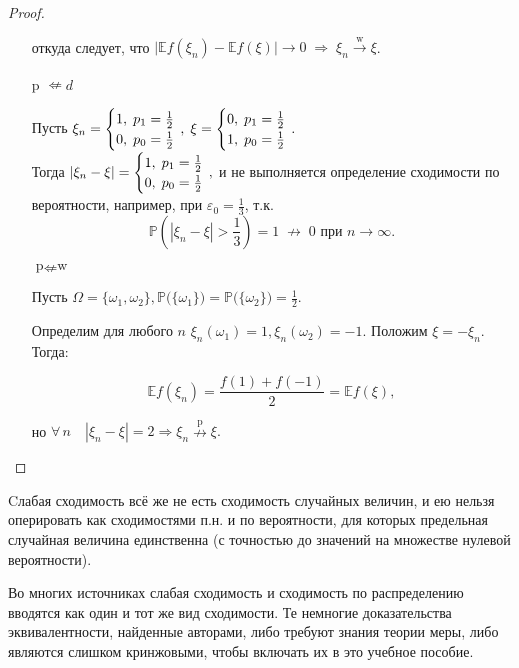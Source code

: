 \begin{proof}
\begin{itemize}
        откуда следует, что $\bigl|\mathbb{E}f(\xi_n) - \mathbb{E}f(\xi)\bigr| \rightarrow 0 \; \Rightarrow \; \xi_n \xrightarrow[]{\text{w}} \xi$.
        
    \item[p $\nLeftarrow d$]
    
        Пусть $\xi_n = \begin{cases}
        1, \; p_1 = \frac{1}{2} \\
        0, \; p_0 = \frac{1}{2}
        \end{cases} \negthickspace \negthickspace \negthickspace , \; 
        \xi = \begin{cases}
        0, \; p_1 = \frac{1}{2} \\
        1, \; p_0 = \frac{1}{2}
        \end{cases} \negthickspace \negthickspace \negthickspace .$ \\
        Тогда $|\xi_n - \xi| = \begin{cases}
        1, \; p_1 = \frac{1}{2} \\
        0, \; p_0 = \frac{1}{2}
        \end{cases} \negthickspace \negthickspace \negthickspace ,$ и не выполняется определение сходимости по вероятности, например, при $\varepsilon_0 = \frac{1}{3}$, т.к. 
        $$ \mathbb{P}\left({|\xi_n - \xi| > \frac{1}{3}}\right) = 1 \; {\nrightarrow} \; 0 \text{ при } n \to \infty.
        $$
        
   \item[$\text{p} \nLeftarrow \text{w}$]
    
        Пусть $\Omega = \{\omega_1, \omega_2 \}, \mathbb{P}\bigl(\{\omega_1\}\bigr) = \mathbb{P}\bigl(\{\omega_2\}\bigr) = \frac{1}{2}.$ 
        
        Определим для любого $n$ $\xi_n(\omega_1) = 1, \xi_n(\omega_2) = -1.$ 
        Положим $\xi = -\xi_n.$ Тогда:
        
        $$ \mathbb{E}f(\xi_n) = \frac{f(1) + f(-1)}{2} = \mathbb{E}f(\xi),$$
        
        но $\forall \, n \quad |\xi_n - \xi| = 2 \Rightarrow \xi_n \overset{\text{p}}{\nrightarrow} \xi.$
    
\end{itemize}    
\end{proof}

\begin{rmrk}
    Cлабая сходимость всё же не есть сходимость случайных величин, и ею нельзя оперировать как сходимостями п.н. и по вероятности, для которых предельная случайная величина единственна (с точностью до значений на множестве нулевой вероятности).
\end{rmrk}

\begin{rmrk}
    Во многих источниках слабая сходимость и сходимость по распределению вводятся как один и тот же вид сходимости. Те немногие доказательства эквивалентности, найденные авторами, либо требуют знания теории меры, либо являются слишком кринжовыми, чтобы включать их в это учебное пособие.
\end{rmrk}
